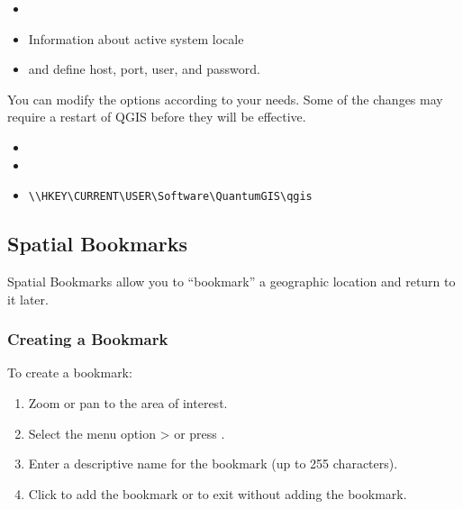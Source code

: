 
\begin{itemize}
\item {}
\item Information about active system locale
\end{itemize}


\begin{itemize}
\item {} and define host, port, user, and password.
\end{itemize}

You can modify the options according to your needs. Some of the changes may 
require a restart of QGIS before they will be effective.

\begin{itemize}
\item {}
\item {}
\item {}
\begin{verbatim}
\\HKEY\CURRENT\USER\Software\QuantumGIS\qgis
\end{verbatim}
\end{itemize}


\subsection{Spatial Bookmarks}\label{sec:bookmarks}

Spatial Bookmarks allow you to ``bookmark'' a geographic location and return to it later.

\subsubsection{Creating a Bookmark}
To create a bookmark:
\begin{enumerate}
\item Zoom or pan to the area of interest.
\item Select the menu option  >  or press .
\item Enter a descriptive name for the bookmark (up to 255 characters).
\item Click  to add the bookmark or  to exit without adding the bookmark.
\end{enumerate}

